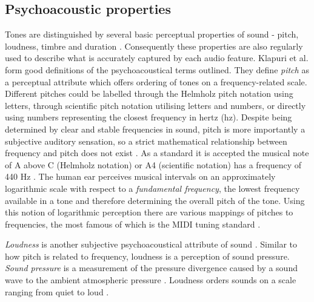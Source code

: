 \subsection{Psychoacoustic properties}
\label{subsec:psychoacoustic}
Tones are distinguished by several basic perceptual properties of sound - pitch,
loudness, timbre and duration \cite{acoustic-glossary-power}. Consequently these
properties are also regularly used to describe what is accurately captured by
each audio feature. Klapuri et al. \cite{klapuri2007signal} form good
definitions of the psychoacoustical terms outlined. They define \textit{pitch}
as a perceptual attribute which offers ordering of tones on a
frequency-related scale. Different pitches could be labelled through the
Helmholz pitch notation \cite{helmholtz2013sensations} using letters, through
scientific pitch notation \cite{fletcher1934loudness} utilising letters and
numbers, or directly using numbers representing the closest frequency in hertz
(hz). Despite being determined by clear and stable frequencies in sound, pitch
is more importantly a subjective auditory sensation, so a strict mathematical
relationship between frequency and pitch does not exist
\cite{acoustical1986american}. As a standard it is accepted the musical note of
A above C (Helmholz notation) or A4 (scientific notation) has a frequency of 440
Hz \cite{young1939terminology}. The human ear perceives musical intervals on an
approximately logarithmic scale with respect to a \textit{fundamental
frequency}, the lowest frequency available in a tone and therefore determining
the overall pitch of the tone. Using this notion of logarithmic perception there
are various mappings of pitches to frequencies, the most famous of which is the
MIDI tuning standard \cite{mts}.

\textit{Loudness} is another subjective psychoacoustical attribute of sound
\cite{klapuri2007signal}. Similar to how pitch is related to frequency, loudness
is a perception of sound pressure. \textit{Sound pressure} is a measurement of
the pressure divergence caused by a sound wave to the ambient atmospheric
pressure \cite{sound-pressure}. Loudness orders sounds on a scale ranging from
quiet to loud \cite{acoustical1986american}.

